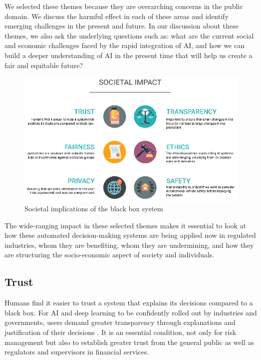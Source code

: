 We selected these themes because they are overarching concerns in the public domain. We discuss the harmful effect in each of these areas and identify emerging challenges in the present and future. In our discussion about these themes, we also ask the underlying questions such as: what are the current social and economic challenges faced by the rapid integration of AI, and how we can build a deeper understanding of AI \cite{Solon2017} in the present time that will help us create a fair and equitable future?

\begin{figure}[htbp]
\centering
\includegraphics[width=1\textwidth]{images/societal-impact-copy.eps}
\caption{Societal implications of the black box system}
\label{fig:societal-impacts}
\end{figure}

The wide-ranging impact in these selected themes makes it essential to look at how these automated decision-making systems are being applied now in regulated industries, whom they are benefiting, whom they are undermining, and how they are structuring the socio-economic aspect of society and individuals\cite{ainow2016report}.

\subsection{Trust}

Humans find it easier to trust a system that explains its decisions compared to a black box. For AI and deep learning to be confidently rolled out by industries and governments, users demand greater transparency through explanations and justification of their decisions \cite{molnar}. It is an essential condition, not only for risk management but also to establish greater trust from the general public as well as regulators and supervisors in financial services.


